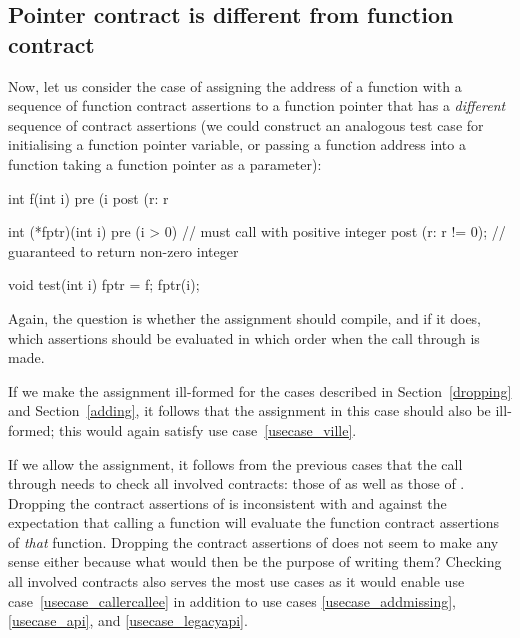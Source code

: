 
\subsection{Pointer contract is different from function contract}
\label{ptrfundifferent}

Now, let us consider the case of assigning the address of a function with a sequence of function contract assertions to a function pointer  that has a \emph{different} sequence of contract assertions (we could construct an analogous test case for initialising a function pointer variable, or passing a function address into a function taking a function pointer as a parameter):
\begin{codeblock}
int f(int i)
  pre (i %
  post (r: r %

int (*fptr)(int i)
  pre (i > 0)           // must call with positive integer
  post (r: r != 0);     // guaranteed to return non-zero integer

void test(int i) {
  fptr = f; 
  fptr(i);   
}
\end{codeblock}
Again, the question is whether the assignment should compile, and if it does, which assertions should be evaluated in which order when the call through  is made.

If we make the assignment ill-formed for the cases described in Section~\ref{dropping} and Section~\ref{adding}, it follows that the assignment in this case should also be ill-formed; this would again satisfy use case~\ref{usecase_ville}.

If we allow the assignment, it follows from the previous cases that the call through  needs to check all involved contracts: those of  as well as those of . Dropping the contract assertions of  is inconsistent with \cite{P2900R9} and against the expectation that calling a function will evaluate the function contract assertions of \emph{that} function. Dropping the contract assertions of  does not seem to make any sense either because what would then be the purpose of writing them? Checking all involved contracts also serves the most use cases as it would enable use case~\ref{usecase_callercallee} in addition to use cases \ref{usecase_addmissing}, \ref{usecase_api}, and \ref{usecase_legacyapi}.

